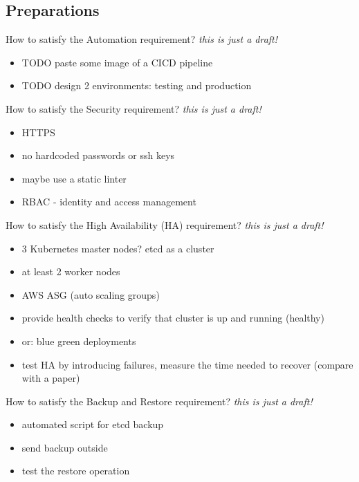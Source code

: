 \documentclass{beamer}
\begin{document}
\subsection{Preparations}
\begin{frame}{How to satisfy the Automation requirement?}%
\textit{this is just a draft!}
\begin{itemize}
	\item TODO paste some image of a CICD pipeline
	\item TODO design 2 environments: testing and production 
\end{itemize}
\end{frame}
\begin{frame}{How to satisfy the Security requirement?}%
\textit{this is just a draft!}
\begin{itemize}
	\item HTTPS
	\item no hardcoded passwords or ssh keys
	\item maybe use a static linter 
	\item RBAC - identity and access management
\end{itemize}
\end{frame}
\begin{frame}{How to satisfy the High Availability (HA) requirement?}%
\textit{this is just a draft!}
\begin{itemize}
	\item 3 Kubernetes master nodes? etcd as a cluster
	\item at least 2 worker nodes
	\item AWS ASG (auto scaling groups)
	\item provide health checks to verify that cluster is up and running (healthy)
	\item or: blue green deployments
	\item test HA by introducing failures, measure the time needed to recover (compare with a paper)
\end{itemize}
\end{frame}

\begin{frame}{How to satisfy the Backup and Restore requirement?}%
\textit{this is just a draft!}
\begin{itemize}
	\item automated script for etcd backup 
	\item send backup outside
	\item test the restore operation
\end{itemize}
\end{frame}
\end{document}

